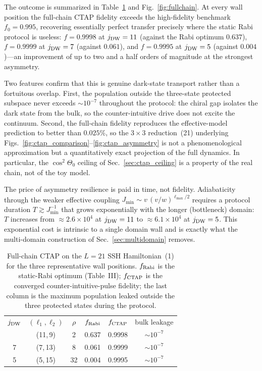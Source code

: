 \documentclass[
  reprint,
  amsmath,
  amssymb,
  aps,
  prb,
  floatfix,
  longbibliography,
]{revtex4-2}
\begin{document}
The outcome is summarized in Table~\ref{tab:fullchain} and
Fig.~\ref{fig:fullchain}. At every wall position the full-chain CTAP fidelity
exceeds the high-fidelity benchmark $f_0=0.995$, recovering essentially
perfect transfer precisely where the static Rabi protocol is useless:
$f=0.9998$ at $j_{\rm DW}=11$ (against the Rabi optimum $0.637$), $f=0.9999$ at
$j_{\rm DW}=7$ (against $0.061$), and $f=0.9995$ at $j_{\rm DW}=5$ (against
$0.004$)---an improvement of up to two and a half orders of magnitude at the
strongest asymmetry.

Two features confirm that this is genuine dark-state transport rather than a
fortuitous overlap. First, the population outside the three-state protected
subspace never exceeds $\sim\!10^{-7}$ throughout the protocol: the chiral gap
isolates the dark state from the bulk, so the counter-intuitive drive does not
excite the continuum. Second, the full-chain fidelity reproduces the
effective-model prediction to better than $0.025\%$, so the $3\times3$
reduction~(21) underlying Figs.~\ref{fig:ctap_comparison}--\ref{fig:ctap_asymmetry}
is not a phenomenological approximation but a quantitatively exact projection of
the full dynamics. In particular, the $\cos^2\Theta_0$ ceiling of
Sec.~\ref{sec:ctap_ceiling} is a property of the real chain, not of the toy model.

The price of asymmetry resilience is paid in time, not fidelity. Adiabaticity
through the weaker effective coupling $J_{\min}\sim v\,(v/w)^{\ell_{\max}/2}$
requires a protocol duration $T\gtrsim J_{\min}^{-1}$ that grows exponentially
with the longer (bottleneck) domain: $T$ increases from $\approx2.6\times10^{4}$
at $j_{\rm DW}=11$ to $\approx6.1\times10^{4}$ at $j_{\rm DW}=5$. This
exponential cost is intrinsic to a single domain wall and is exactly what the
multi-domain construction of Sec.~\ref{sec:multidomain} removes.

\begin{table}[!t]
\caption{Full-chain CTAP on the $L=21$ SSH Hamiltonian~(1) for the three
representative wall positions. $f_{\rm Rabi}$ is the static-Rabi optimum
(Table~III); $f_{\rm CTAP}$ is the converged counter-intuitive-pulse fidelity;
the last column is the maximum population leaked outside the three protected
states during the protocol.}
\label{tab:fullchain}
\begin{ruledtabular}
\begin{tabular}{cccccc}
$j_{\rm DW}$ & $(\ell_1,\ell_2)$ & $\rho$ & $f_{\rm Rabi}$ & $f_{\rm CTAP}$ & bulk leakage \\
\colrule
11 & (11,\,9)  & 2  & 0.637 & 0.9998 & $\sim\!10^{-7}$ \\
7  & (7,\,13)  & 8  & 0.061 & 0.9999 & $\sim\!10^{-7}$ \\
5  & (5,\,15)  & 32 & 0.004 & 0.9995 & $\sim\!10^{-7}$ \\
\end{tabular}
\end{ruledtabular}
\end{table}
\end{document}
